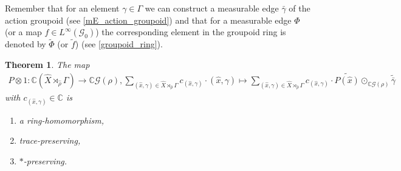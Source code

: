\documentclass[12pt,a4paper]{scrartcl}
\theoremstyle{plain}
\newtheorem{Theorem}{Theorem}[section]
\theoremstyle{definition}
\numberwithin{equation}{section}
\newcommand{\C}{\mathbb{C}} %
\newcommand{\2}{\mathbb{Z} / 2 \mathbb{Z}}
\newcommand{\G}{\mathcal{G}}
\newcommand{\1}{\bar{1}}
\newcommand{\0}{\bar{0}}
\begin{document}
Remember that for an element $\gamma \in \Gamma$ we can construct a measurable edge $\bar{\gamma}$ of the action groupoid (see \ref{mE_action_groupoid}) and that for a measurable edge $\Phi$ (or a map $f \in L^\infty (\G_0)$) the corresponding element in the groupoid ring is denoted by $\tilde{\Phi}$ (or $\tilde{f}$) (see \ref{groupoid_ring}).
\begin{Theorem}\label{map_pantryagin} 
	The map 
	\begin{align*}
		P \otimes 1\colon\C(\hat{X} \rtimes_{\hat{\rho}} \Gamma) \to \C\G(\rho), 
		\sum_{(\hat{x}, \gamma) \in \hat{X} \rtimes_{\hat{\rho}} \Gamma}
		 c_{(\hat{x}, \gamma)} \cdot (\hat{x}, \gamma) \mapsto 
		 \sum_{(\hat{x}, \gamma) \in \hat{X} \rtimes_{\hat{\rho}} \Gamma} 
		 c_{(\hat{x}, \gamma)} \cdot \widetilde{P(\hat{x})} \odot_{\C\G(\rho)} \widetilde{\bar{\gamma}} 
	\end{align*}
	 with $c_{(\hat{x}, \gamma)} \in \C$ is
	\begin{enumerate}
		\item a ring-homomorphism,
		\item trace-preserving,
		\item $*$-preserving.
	\end{enumerate}
\end{Theorem} 
\end{document}
